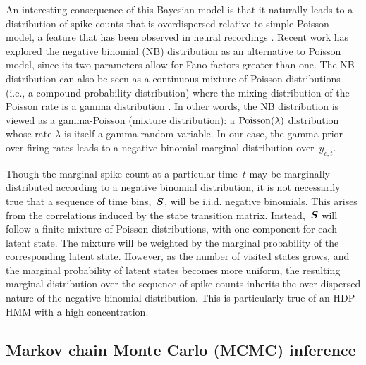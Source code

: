 An interesting consequence of this Bayesian model is that it naturally
leads to a distribution of spike counts that is overdispersed relative
to simple Poisson model, a feature that has been observed in neural
recordings \citep{Goris14}. Recent work has explored the negative
binomial (NB) distribution as an alternative to Poisson model, since
its two parameters allow for Fano factors greater than one.  The NB
distribution can also be seen as a continuous mixture of Poisson
distributions (i.e., a compound probability distribution) where the
mixing distribution of the Poisson rate is a gamma distribution
\citep{Gelman13}. In other words, the NB distribution is viewed as a
gamma-Poisson (mixture distribution): a $\mathrm{Poisson}(\lambda)$
distribution whose rate $\lambda$ is itself a gamma random
variable. In our case, the gamma prior over firing rates leads to a
negative binomial marginal distribution over~$y_{c,t}$.

Though the marginal spike count at a particular time~$t$ may be
marginally distributed according to a negative binomial distribution,
it is not necessarily true that a sequence of time bins,~$\boldsymbol{S}$,
will be i.i.d. negative binomials. This arises from the correlations
induced by the state transition matrix. Instead,~$\boldsymbol{S}$ will
follow a finite mixture of Poisson distributions, with one component
for each latent state. The mixture will be weighted by the marginal
probability of the corresponding latent state. However, as the number
of visited states grows, and the marginal probability of latent states
becomes more uniform, the resulting marginal distribution over the
sequence of spike counts inherits the over dispersed nature of the
negative binomial distribution. This is particularly true of an
HDP-HMM with a high concentration.

\subsection{Markov chain Monte Carlo (MCMC) inference}


